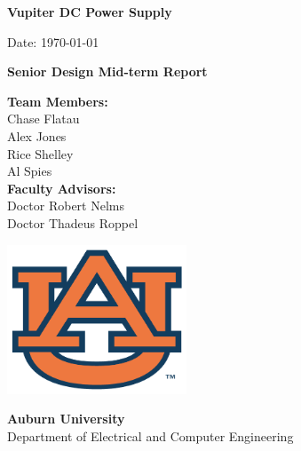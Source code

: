 \documentclass[15pt]{article}
\begin{document}
\begin{titlepage}
    \begin{singlespace}
    \begin{center}
        \vspace*{1cm}
            
        \Huge
        \textbf{Vupiter DC Power Supply}
            
        \vspace{0.5cm}
        \large
        Date: \today
            
        \vspace{2.25cm}

        \textbf{Senior Design Mid-term Report}
        
        \vspace{2.25cm}

        \textbf{Team Members:}\\
        Chase Flatau\\
        Alex Jones\\
        Rice Shelley\\
        Al Spies\\
        \textbf{Faculty Advisors:}\\
        Doctor Robert Nelms\\
        Doctor Thadeus Roppel
        \vfill
            
            
        \vspace{0.8cm}
            
        \includegraphics[width=0.4\textwidth]{university}
            
        \Large

        \textbf{Auburn University}\\
        Department of Electrical and Computer Engineering\\

            
    \end{center}
\end{singlespace}
\end{titlepage}
\end{document}
